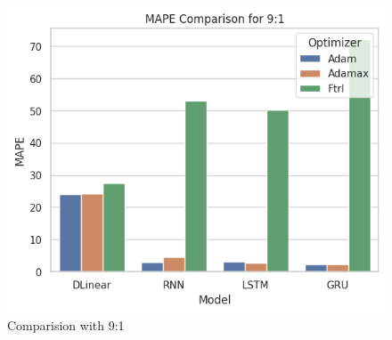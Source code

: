 \documentclass{ieeeojies}
\begin{document}
\begin{figure}[H]
\begin{minipage}{0.15\textwidth}
    \includegraphics[width=1\textwidth]{image/MAPE_91_btc.png}
    \caption{Comparision with 9:1}
    \end{minipage}
\end{figure}
\end{document}
